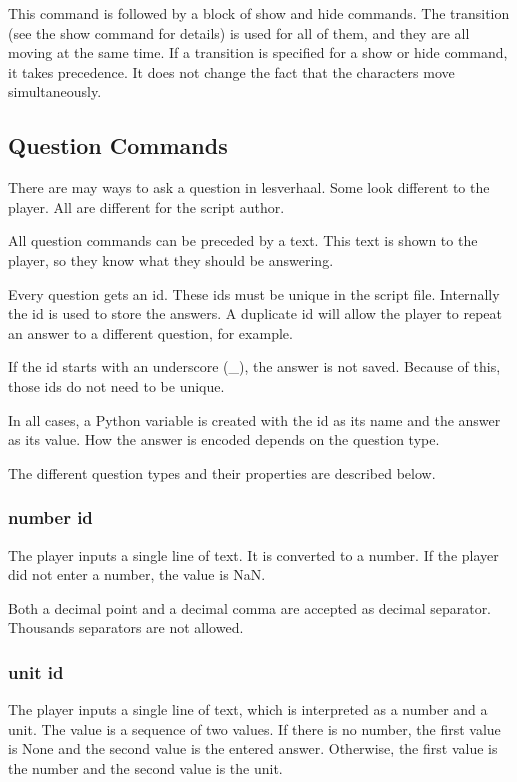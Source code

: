 \documentclass{article}
\begin{document}
This command is followed by a block of show and hide commands. The transition
(see the show command for details) is used for all of them, and they are all
moving at the same time. If a transition is specified for a show or hide
command, it takes precedence. It does not change the fact that the characters
move simultaneously.

\subsection{Question Commands}
There are may ways to ask a question in lesverhaal. Some look different to the
player. All are different for the script author.

All question commands can be preceded by a text. This text is shown to the
player, so they know what they should be answering.

Every question gets an id. These ids must be unique in the script file.
Internally the id is used to store the answers. A duplicate id will allow the
player to repeat an answer to a different question, for example.

If the id starts with an underscore (\_), the answer is not saved. Because of
this, those ids do not need to be unique.

In all cases, a Python variable is created with the id as its name and the
answer as its value. How the answer is encoded depends on the question type.

The different question types and their properties are described below.

\subsubsection{number id}
The player inputs a single line of text. It is converted to a number. If the
player did not enter a number, the value is NaN.

Both a decimal point and a decimal comma are accepted as decimal separator.
Thousands separators are not allowed.

\subsubsection{unit id}
The player inputs a single line of text, which is interpreted as a number and a
unit. The value is a sequence of two values. If there is no number, the first
value is None and the second value is the entered answer. Otherwise, the first
value is the number and the second value is the unit.
\end{document}
